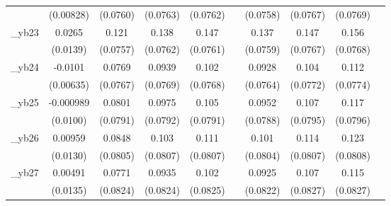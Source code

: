 \begin{table}[htbp]
\begin{tabular}{l*{9}{c}}
            &   (0.00828)         &    (0.0760)         &    (0.0763)         &    (0.0762)         &                     &    (0.0758)         &    (0.0767)         &    (0.0769)         &                     \\
[1em]
\_yb23       &      0.0265\sym{*}  &       0.121         &       0.138\sym{*}  &       0.147\sym{*}  &                     &       0.137\sym{*}  &       0.147\sym{*}  &       0.156\sym{**} &                     \\
            &    (0.0139)         &    (0.0757)         &    (0.0762)         &    (0.0761)         &                     &    (0.0759)         &    (0.0767)         &    (0.0768)         &                     \\
[1em]
\_yb24       &     -0.0101         &      0.0769         &      0.0939         &       0.102         &                     &      0.0928         &       0.104         &       0.112         &                     \\
            &   (0.00635)         &    (0.0767)         &    (0.0769)         &    (0.0768)         &                     &    (0.0764)         &    (0.0772)         &    (0.0774)         &                     \\
[1em]
\_yb25       &   -0.000989         &      0.0801         &      0.0975         &       0.105         &                     &      0.0952         &       0.107         &       0.117         &                     \\
            &    (0.0100)         &    (0.0791)         &    (0.0792)         &    (0.0791)         &                     &    (0.0788)         &    (0.0795)         &    (0.0796)         &                     \\
[1em]
\_yb26       &     0.00959         &      0.0848         &       0.103         &       0.111         &                     &       0.101         &       0.114         &       0.123         &                     \\
            &    (0.0130)         &    (0.0805)         &    (0.0807)         &    (0.0807)         &                     &    (0.0804)         &    (0.0807)         &    (0.0808)         &                     \\
[1em]
\_yb27       &     0.00491         &      0.0771         &      0.0935         &       0.102         &                     &      0.0925         &       0.107         &       0.115         &                     \\
            &    (0.0135)         &    (0.0824)         &    (0.0824)         &    (0.0825)         &                     &    (0.0822)         &    (0.0827)         &    (0.0827)         &                     \\

\end{tabular}
\end{table}
